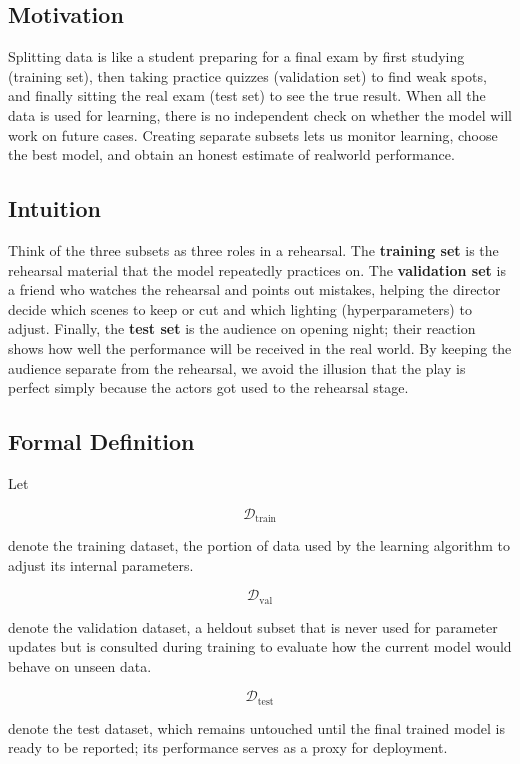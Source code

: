 \documentclass[12pt, a4paper]{article}
\begin{document}
\subsection{Motivation}
Splitting data is like a student preparing for a final exam by first studying (training set), then taking practice quizzes (validation set) to find weak spots, and finally sitting the real exam (test set) to see the true result.  
When all the data is used for learning, there is no independent check on whether the model will work on future cases.  
Creating separate subsets lets us monitor learning, choose the best model, and obtain an honest estimate of realworld performance.

\subsection{Intuition}
Think of the three subsets as three roles in a rehearsal. The \textbf{training set} is the rehearsal material that the model repeatedly practices on. The \textbf{validation set} is a friend who watches the rehearsal and points out mistakes, helping the director decide which scenes to keep or cut and which lighting (hyperparameters) to adjust. Finally, the \textbf{test set} is the audience on opening night; their reaction shows how well the performance will be received in the real world. By keeping the audience separate from the rehearsal, we avoid the illusion that the play is perfect simply because the actors got used to the rehearsal stage.

\subsection{Formal Definition}
Let  

\[
\mathcal{D}_{\text{train}}
\]

denote the training dataset, the portion of data used by the learning algorithm to adjust its internal parameters.  

\[
\mathcal{D}_{\text{val}}
\]

denote the validation dataset, a heldout subset that is never used for parameter updates but is consulted during training to evaluate how the current model would behave on unseen data.  

\[
\mathcal{D}_{\text{test}}
\]

denote the test dataset, which remains untouched until the final trained model is ready to be reported; its performance serves as a proxy for deployment.  
\end{document}
